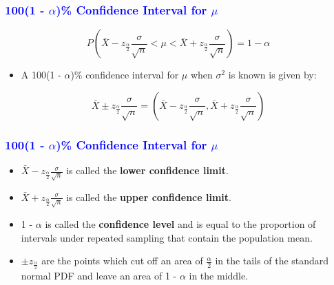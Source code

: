 \documentclass[12pt]{beamer}
\begin{document}
\begin{frame}
	\frametitle{\textcolor{blue}{100(1 - $\alpha$)\% Confidence Interval for $\mu$}}
	
	\begin{equation*}
		P\left(\bar{X} - z_{\frac{\alpha}{2}}\frac{\sigma}{\sqrt{n}} < \mu < \bar{X} + z_{\frac{\alpha}{2}}\frac{\sigma}{\sqrt{n}}\right) = 1 - \alpha
	\end{equation*}
	
	\begin{itemize}[label={\color{blue}$\blacktriangleright$}]
		\item A 100(1 - $\alpha$)\% confidence interval for $\mu$ when $\sigma^2$ is known is given by:
	\end{itemize}
	
	\begin{equation*}
		\bar{X} \pm z_{\frac{\alpha}{2}}\frac{\sigma}{\sqrt{n}} = \left(\bar{X} - z_{\frac{\alpha}{2}}\frac{\sigma}{\sqrt{n}}, \bar{X} + z_{\frac{\alpha}{2}}\frac{\sigma}{\sqrt{n}}\right)
	\end{equation*}
	
\end{frame}
\begin{frame}
	\frametitle{\textcolor{blue}{100(1 - $\alpha$)\% Confidence Interval for $\mu$}}
	
	\begin{itemize}[label={\color{blue}$\blacktriangleright$}]
		\item $\bar{X} - z_{\frac{\alpha}{2}}\frac{\sigma}{\sqrt{n}}$ is called the \textbf{lower confidence limit}.
		
		\item $\bar{X} + z_{\frac{\alpha}{2}}\frac{\sigma}{\sqrt{n}}$ is called the \textbf{upper confidence limit}.
		
		\item 1 - $\alpha$ is called the \textbf{confidence level} and is equal to the proportion of intervals under repeated sampling that contain the population mean.
		
		\item $\pm z_{\frac{\alpha}{2}}$ are the points which cut off an area of $\frac{\alpha}{2}$ in the tails of the standard normal PDF and leave an area of 1 - $\alpha$ in the middle.
	\end{itemize}
	
\end{frame}
\end{document}
